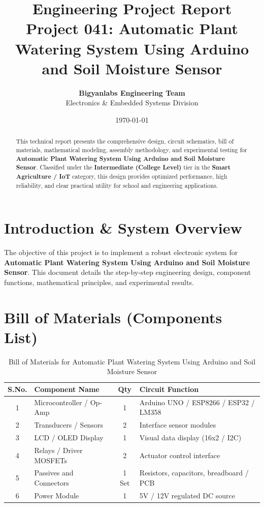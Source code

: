 \documentclass[11pt,a4paper]{article}
\title{\textbf{\Huge Engineering Project Report}\\[0.5em] \Large Project 041: Automatic Plant Watering System Using Arduino and Soil Moisture Sensor}
\author{\textbf{Bigyanlabs Engineering Team}\\ Electronics \& Embedded Systems Division}
\date{\today}
\begin{document}
\maketitle
\thispagestyle{empty}

\begin{abstract}
This technical report presents the comprehensive design, circuit schematics, bill of materials, mathematical modeling, assembly methodology, and experimental testing for \textbf{Automatic Plant Watering System Using Arduino and Soil Moisture Sensor}. Classified under the \textbf{Intermediate (College Level)} tier in the \textbf{Smart Agriculture / IoT} category, this design provides optimized performance, high reliability, and clear practical utility for school and engineering applications.
\end{abstract}

\newpage
\tableofcontents
\newpage

\section{Introduction \& System Overview}
The objective of this project is to implement a robust electronic system for \textbf{Automatic Plant Watering System Using Arduino and Soil Moisture Sensor}. This document details the step-by-step engineering design, component functions, mathematical principles, and experimental results.

\section{Bill of Materials (Components List)}
\begin{table}[h!]
\centering
\caption{Bill of Materials for Automatic Plant Watering System Using Arduino and Soil Moisture Sensor}
\vspace{0.5em}
\begin{tabular}{clcp{7cm}}
\toprule
\textbf{S.No.} & \textbf{Component Name} & \textbf{Qty} & \textbf{Circuit Function} \\
\midrule
1 & Microcontroller / Op-Amp & 1 & Arduino UNO / ESP8266 / ESP32 / LM358 \\
2 & Transducers / Sensors & 2 & Interface sensor modules \\
3 & LCD / OLED Display & 1 & Visual data display (16x2 / I2C) \\
4 & Relays / Driver MOSFETs & 2 & Actuator control interface \\
5 & Passives and Connectors & 1 Set & Resistors, capacitors, breadboard / PCB \\
6 & Power Module & 1 & 5V / 12V regulated DC source \\
\bottomrule
\end{tabular}
\end{table}
\end{document}
